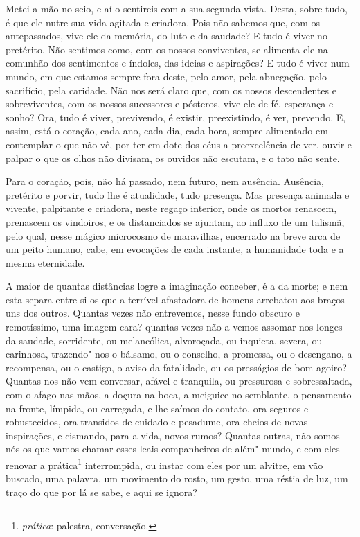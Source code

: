 Metei a mão no seio, e aí o sentireis com a sua segunda vista.
Desta, sobre tudo, é que ele nutre sua vida agitada e criadora. Pois
não sabemos que, com os antepassados, vive ele da memória, do luto e da
saudade? E tudo é viver no pretérito. Não sentimos como, com os nossos
conviventes, se alimenta ele na comunhão dos sentimentos e índoles, das
ideias e aspirações? E tudo é viver num mundo, em que estamos sempre
fora deste, pelo amor, pela abnegação, pelo sacrifício, pela caridade.
Não nos será claro que, com os nossos descendentes e sobreviventes, com
os nossos sucessores e pósteros, vive ele de fé, esperança e sonho?
Ora, tudo é viver, previvendo, é existir, preexistindo, é ver,
prevendo. E, assim, está o coração, cada ano, cada dia, cada hora,
sempre alimentado em contemplar o que não vê, por ter em dote dos céus
a preexcelência de ver, ouvir e palpar o que os olhos não divisam, os
ouvidos não escutam, e o tato não sente.

Para o coração, pois, não há passado, nem futuro, nem ausência.
Ausência, pretérito e porvir, tudo lhe é atualidade, tudo presença. Mas
presença animada e vivente, palpitante e criadora, neste regaço
interior, onde os mortos renascem, prenascem os vindoiros, e os
distanciados se ajuntam, ao influxo de um talismã, pelo qual, nesse
mágico microcosmo de maravilhas, encerrado na breve arca de um peito
humano, cabe, em evocações de cada instante, a humanidade toda e a
mesma eternidade.

A maior de quantas distâncias logre a imaginação conceber, é a da
morte; e nem esta separa entre si os que a terrível afastadora de
homens arrebatou aos braços uns dos outros. Quantas vezes não
entrevemos, nesse fundo obscuro e remotíssimo, uma imagem cara? quantas
vezes não a vemos assomar nos longes da saudade, sorridente, ou
melancólica, alvoroçada, ou inquieta, severa, ou carinhosa,
trazendo"-nos o bálsamo, ou o conselho, a promessa, ou o desengano, a
recompensa, ou o castigo, o aviso da fatalidade, ou os presságios de
bom agoiro? Quantas nos não vem conversar, afável e tranquila, ou
pressurosa e sobressaltada, com o afago nas mãos, a doçura na boca, a
meiguice no semblante, o pensamento na fronte, límpida, ou carregada, e
lhe saímos do contato, ora seguros e robustecidos, ora
transidos de cuidado e
pesadume, ora cheios de novas inspirações, e cismando, para a vida,
novos rumos? Quantas outras, não somos nós os que vamos chamar esses
leais companheiros de além"-mundo, e com eles renovar a
prática\footnote{ \textit{prática}: palestra, conversação.} interrompida, ou instar com eles por um alvitre, em
vão buscado, uma palavra, um movimento do rosto, um gesto, uma réstia
de luz, um traço do que por lá se sabe, e aqui se ignora?

